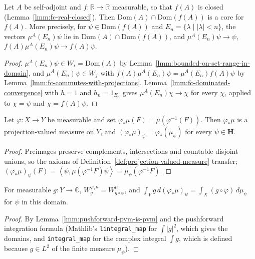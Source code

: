 \begin{lemma}
    \label{lmm:fc-core}
    \leanok
    Let $A$ be self-adjoint and $f : \mathbb{R} \to \mathbb{R}$ measurable, so that $f(A)$ is closed (Lemma~\ref{lmm:fc-real-closed}). Then $\text{Dom}(A) \cap \text{Dom}(f(A))$ is a core for $f(A)$. More precisely, for $\psi \in \text{Dom}(f(A))$ and $E_n = \{ \lambda \mid |\lambda| < n \}$, the vectors $\mu^A(E_n)\psi$ lie in $\text{Dom}(A) \cap \text{Dom}(f(A))$, and $\mu^A(E_n)\psi \to \psi$, $f(A)\mu^A(E_n)\psi \to f(A)\psi$.
\end{lemma}
\begin{proof}
    \leanok
    $\mu^A(E_n)\psi \in W_\iota = \text{Dom}(A)$ by Lemma~\ref{lmm:bounded-on-set-range-in-domain}, and $\mu^A(E_n)\psi \in W_f$ with $f(A)\mu^A(E_n)\psi = \mu^A(E_n)f(A)\psi$ by Lemma~\ref{lmm:fc-commutes-with-projections}. Lemma~\ref{lmm:fc-dominated-convergence} with $h = 1$ and $h_n = 1_{E_n}$ gives $\mu^A(E_n)\chi \to \chi$ for every $\chi$, applied to $\chi = \psi$ and $\chi = f(A)\psi$.
\end{proof}

\begin{lemma}
    \label{lmm:pushforward-pvm-is-pvm}
    \leanok
    Let $\varphi : X \to Y$ be measurable and set $\varphi_*\mu(F) = \mu(\varphi^{-1}(F))$. Then $\varphi_*\mu$ is a projection-valued measure on $Y$, and $(\varphi_*\mu)_\psi = \varphi_*(\mu_\psi)$ for every $\psi \in \mathbf{H}$.
\end{lemma}
\begin{proof}
    \leanok
    Preimages preserve complements, intersections and countable disjoint unions, so the axioms of Definition~\ref{def:projection-valued-measure} transfer; $(\varphi_*\mu)_\psi(F) = \left< \psi, \mu(\varphi^{-1}F)\psi \right> = \mu_\psi(\varphi^{-1}F)$.
\end{proof}

\begin{lemma}
    \label{lmm:pushforward-pvm-domain}
    \leanok
    For measurable $g : Y \to \mathbb{C}$, $W^{\varphi_*\mu}_g = W^\mu_{g \circ \varphi}$, and $\int_Y g \, d(\varphi_*\mu)_\psi = \int_X (g \circ \varphi) \, d\mu_\psi$ for $\psi$ in this domain.
\end{lemma}
\begin{proof}
    \leanok
    By Lemma~\ref{lmm:pushforward-pvm-is-pvm} and the pushforward integration formula (Mathlib's \texttt{lintegral\_map} for $\int |g|^2$, which gives the domains, and \texttt{integral\_map} for the complex integral $\int g$, which is defined because $g \in L^2$ of the finite measure $\mu_\psi$).
\end{proof}

